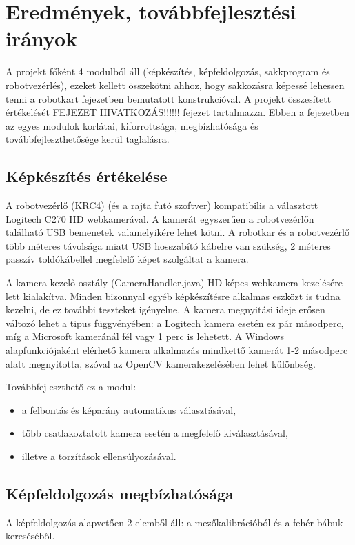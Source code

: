 \documentclass[../documentation.tex]{subfiles}
\begin{document}
\section{Eredmények, továbbfejlesztési irányok}
A projekt főként 4 modulból áll (képkészítés, képfeldolgozás, sakkprogram és robotvezérlés), ezeket kellett összekötni ahhoz, hogy sakkozásra képessé lehessen tenni a robotkart  fejezetben bemutatott konstrukcióval. A projekt összesített értékelését FEJEZET HIVATKOZÁS!!!!!! fejezet tartalmazza. Ebben a fejezetben az egyes modulok korlátai, kiforrottsága, megbízhatósága és továbbfejleszthetősége kerül taglalásra.

\subsection{Képkészítés értékelése}
A robotvezérlő (KRC4) (és a rajta futó szoftver) kompatibilis a választott Logitech C270 HD webkamerával. A kamerát egyszerűen a robotvezérlőn található USB bemenetek valamelyikére lehet kötni. A robotkar és a robotvezérlő több méteres távolsága miatt USB hosszabító kábelre van szükség, 2 méteres passzív toldókábellel megfelelő képet szolgáltat a kamera.

A kamera kezelő osztály (CameraHandler.java) HD képes webkamera kezelésére lett kialakítva. Minden bizonnyal egyéb képkészítésre alkalmas eszközt is tudna kezelni, de ez további teszteket igényelne. A kamera megnyitási ideje erősen változó lehet a tipus függvényében: a Logitech kamera esetén ez pár másodperc, míg a Microsoft kameránál fél vagy 1 perc is lehetett. A Windows alapfunkciójaként elérhető kamera alkalmazás mindkettő kamerát 1-2 másodperc alatt megnyitotta, szóval az OpenCV kamerakezelésében lehet különbség.

Továbbfejleszthető ez a modul:
\begin{itemize}
	\item a felbontás és képarány automatikus választásával,
	\item több csatlakoztatott kamera esetén a megfelelő kiválasztásával,
	\item illetve a torzítások ellensúlyozásával.
\end{itemize}

\subsection{Képfeldolgozás megbízhatósága}
A képfeldolgozás alapvetően 2 elemből áll: a mezőkalibrációból és a fehér bábuk kereséséből.
\end{document}
